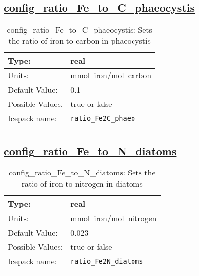 \subsection[config\_ratio\_Fe\_to\_C\_phaeocystis]{\hyperref[sec:nm_tab_biogeochemistry]{config\_ratio\_Fe\_to\_C\_phaeocystis}}
\label{subsec:nm_sec_config_ratio_Fe_to_C_phaeocystis}
\begin{center}
\begin{longtable}{| p{2.0in} || p{4.0in} |}
    \hline
    Type: & real \\
    \hline
    Units: & \si{mmol.iron/mol.carbon} \\
    \hline
    Default Value: & 0.1 \\
    \hline
    Possible Values: & true or false \\
    \hline
    \hline
    Icepack name: & \verb+ratio_Fe2C_phaeo+ \\
    \caption{config\_ratio\_Fe\_to\_C\_phaeocystis: Sets the ratio of iron to carbon in phaeocystis}
\end{longtable}
\end{center}
\subsection[config\_ratio\_Fe\_to\_N\_diatoms]{\hyperref[sec:nm_tab_biogeochemistry]{config\_ratio\_Fe\_to\_N\_diatoms}}
\label{subsec:nm_sec_config_ratio_Fe_to_N_diatoms}
\begin{center}
\begin{longtable}{| p{2.0in} || p{4.0in} |}
    \hline
    Type: & real \\
    \hline
    Units: & \si{mmol.iron/mol.nitrogen} \\
    \hline
    Default Value: & 0.023 \\
    \hline
    Possible Values: & true or false \\
    \hline
    \hline
    Icepack name: & \verb+ratio_Fe2N_diatoms+ \\
    \caption{config\_ratio\_Fe\_to\_N\_diatoms: Sets the ratio of iron to nitrogen in diatoms}
\end{longtable}
\end{center}
